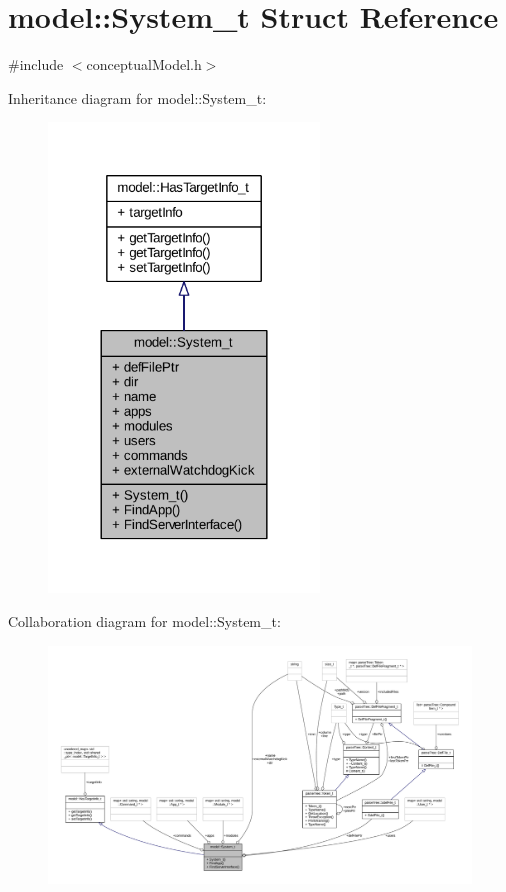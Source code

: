 \hypertarget{structmodel_1_1_system__t}{}\section{model\+:\+:System\+\_\+t Struct Reference}
\label{structmodel_1_1_system__t}


{\ttfamily \#include $<$conceptual\+Model.\+h$>$}



Inheritance diagram for model\+:\+:System\+\_\+t\+:
\nopagebreak
\begin{figure}[H]
\begin{center}
\leavevmode
\includegraphics[width=204pt]{structmodel_1_1_system__t__inherit__graph}
\end{center}
\end{figure}


Collaboration diagram for model\+:\+:System\+\_\+t\+:
\nopagebreak
\begin{figure}[H]
\begin{center}
\leavevmode
\includegraphics[width=350pt]{structmodel_1_1_system__t__coll__graph}
\end{center}
\end{figure}
